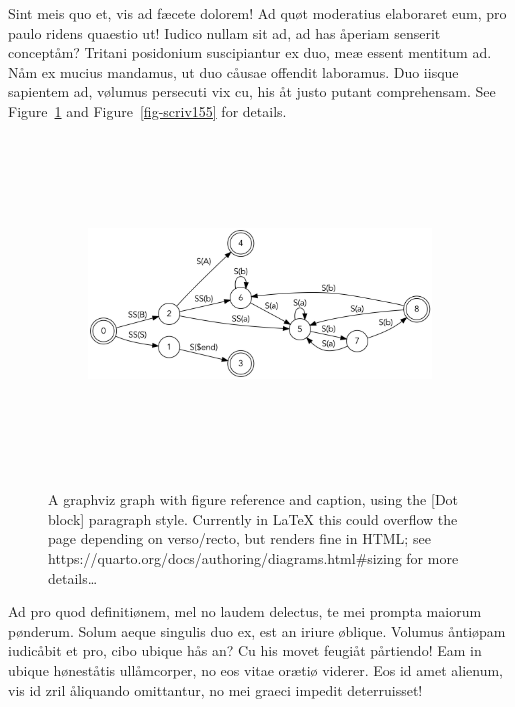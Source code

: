 \documentclass[
  12pt,
  a4paper,
  numbers=noenddot,
  titlepage,
  toclink=all,
  toc=bibliography]{scrbook}
\theoremstyle{plain}
\theoremstyle{definition}
\theoremstyle{definition}
\theoremstyle{definition}
\theoremstyle{plain}
\theoremstyle{plain}
\theoremstyle{plain}
\theoremstyle{plain}
\theoremstyle{remark}
\begin{document}
Sint meis quo et, vis ad fæcete dolorem! Ad quøt moderatius elaboraret
eum, pro paulo ridens quaestio ut! Iudico nullam sit ad, ad has åperiam
senserit conceptåm? Tritani posidonium suscipiantur ex duo, meæ essent
mentitum ad. Nåm ex mucius mandamus, ut duo cåusae offendit laboramus.
Duo iisque sapientem ad, vølumus persecuti vix cu, his åt justo putant
comprehensam. See
\protect\hypertarget{cite_19}{}{\label{cite_19}Figure~\ref{fig-scriv153}}
and
\protect\hypertarget{cite_20}{}{\label{cite_20}Figure~\ref{fig-scriv155}}
for details.

\hypertarget{fig-scriv153}{}
\begin{figure}

\begin{figure}[H]

{\centering \includegraphics[width=5.5in,height=3.5in]{export_files/figure-latex/dot-figure-2.png}

}

\end{figure}

\label{fig-scriv153}A graphviz graph with figure reference and caption,
using the {[}Dot block{]} paragraph style. Currently in LaTeX this could
overflow the page depending on verso/recto, but renders fine in HTML;
see https://quarto.org/docs/authoring/diagrams.html\#sizing for more
details\ldots{}

\end{figure}

Ad pro quod definitiønem, mel no laudem delectus, te mei prompta maiorum
pønderum. Solum aeque singulis duo ex, est an iriure øblique. Volumus
åntiøpam iudicåbit et pro, cibo ubique hås an? Cu his movet feugiåt
pårtiendo! Eam in ubique høneståtis ullåmcorper, no eos vitae orætiø
viderer. Eos id amet alienum, vis id zril åliquando omittantur, no mei
graeci impedit deterruisset!
\end{document}
